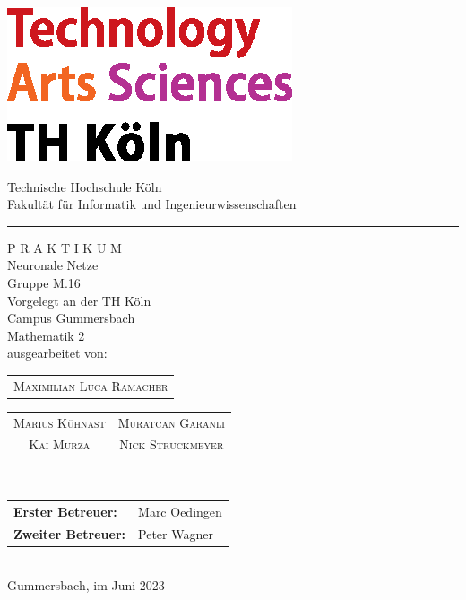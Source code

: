 \documentclass[a4paper,12pt,oneside]{article}
\begin{document}
  \pagestyle{empty} %
  \newpage %
  
  \pagestyle{empty}
  \begin{titlepage}
    \includegraphics[scale=1.00]{Sources/logo_TH-Koeln_CMYK_22pt}\\
    \begin{center}
      \Large
      Technische Hochschule Köln\\
      Fakultät für Informatik und Ingenieurwissenschaften\\
      \hrule\par\rule{0pt}{2cm} %
      \LARGE
      \textsc{P R A K T I K U M}\\
      \vspace{1cm} %
      \huge
      Neuronale Netze\\
      \Large
      Gruppe M.16\\
      \vspace{1.5cm}
      \large
      Vorgelegt an der TH Köln\\
      Campus Gummersbach\\
      Mathematik 2\\ 
      \vspace{1.0cm}
      ausgearbeitet von:\\
      \begin{tabular}{c}
        \textsc{Maximilian Luca Ramacher}
      \end{tabular}
      \begin{tabular}{c c}
        \textsc{Marius Kühnast} &
        \textsc{Muratcan Garanli}\\
        \textsc{Kai Murza} &
        \textsc{Nick Struckmeyer}\\
      \end{tabular}\\
      \vspace{1.5cm}
      \begin{tabular}{ll} %
          \textbf{Erster Betreuer:} & Marc Oedingen \\
          \textbf{Zweiter Betreuer:} & Peter Wagner \\
      \end{tabular}
      \vspace{1.5cm}
      \\Gummersbach, im Juni 2023
    \end{center}    
  \end{titlepage}
\end{document}
